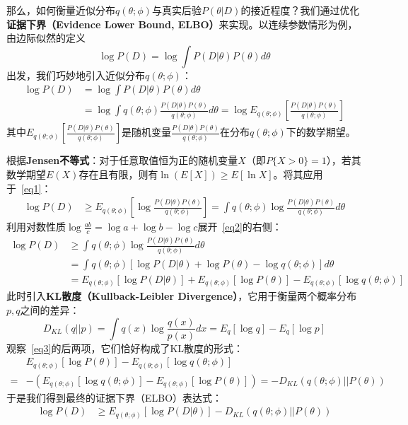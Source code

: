 那么，如何衡量近似分布$q(\theta;\phi)$与真实后验$P(\theta|D)$的接近程度？我们通过优化\textbf{证据下界（Evidence Lower Bound, ELBO）}来实现。以连续参数情形为例，由边际似然的定义
$$\log P(D) = \log \int P(D|\theta)P(\theta)d\theta$$
出发，我们巧妙地引入近似分布$q(\theta;\phi)$：
\begin{align}\label{eq1}
\log P(D) &= \log \int P(D|\theta)P(\theta)d\theta \nonumber \\
          &= \log \int q(\theta;\phi)\frac{P(D|\theta)P(\theta)}{q(\theta;\phi)}d\theta  =   \log {E}_{q(\theta;\phi)}\left[\frac{P(D|\theta)P(\theta)}{q(\theta;\phi)}\right]
\end{align}
其中$E_{q(\theta;\phi)}\left[\frac{P(D|\theta)P(\theta)}{q(\theta;\phi)}\right]$是随机变量$\frac{P(D|\theta)P(\theta)}{q(\theta;\phi)}$在分布$q(\theta;\phi)$下的数学期望。

根据\textbf{Jensen不等式}：对于任意取值恒为正的随机变量$X$（即$P\{X>0\}=1$），若其数学期望$E(X)$存在且有限，则有$\ln(E[X]) \ge E[\ln X]$。将其应用于~\eqref{eq1}：
\begin{align}\label{eq2}
        \log P(D)  &\geq E_{q(\theta;\phi)}\left[\log\frac{P(D|\theta)P(\theta)}{q(\theta;\phi)}\right]
          = \int q(\theta;\phi)\log\frac{P(D|\theta)P(\theta)}{q(\theta;\phi)}d\theta
\end{align}
利用对数性质$\log\frac{ab}{c} = \log a + \log b - \log c$展开~\eqref{eq2}的右侧：
\begin{align}\label{eq3}
        \log P(D)  &\geq    \int q(\theta;\phi)\log\frac{P(D|\theta)P(\theta)}{q(\theta;\phi)}d\theta \nonumber  \\
                   &=    \int q(\theta;\phi)[ \log{P(D|\theta)} + \log P(\theta)-\log q(\theta;\phi)] d\theta \nonumber \\
        &= E_{q(\theta;\phi)}[\log P(D|\theta)] + E_{q(\theta;\phi)}[\log P(\theta)] - E_{q(\theta;\phi)}[\log q(\theta;\phi)]
\end{align}
此时引入\textbf{KL散度（Kullback-Leibler Divergence）}，它用于衡量两个概率分布$p,q$之间的差异：
$$ D_{KL}(q||p) = \int q(x)\log\frac{q(x)}{p(x)}dx = E_q[\log q] - E_q[\log p] $$
观察~\eqref{eq3}的后两项，它们恰好构成了KL散度的形式：
\begin{align*}
& E_{q(\theta;\phi)}[\log P(\theta)] - E_{q(\theta;\phi)}[\log q(\theta;\phi)] \\
=&- \left(E_{q(\theta;\phi)}[\log q(\theta;\phi)]-  E_{q(\theta;\phi)}[\log P(\theta)]  \right) =- D_{KL}(q(\theta;\phi)||P(\theta))
\end{align*}
于是我们得到最终的证据下界（ELBO）表达式：
\begin{align}\label{elbo}
\log P(D) &\geq  E_{q(\theta;\phi)}[\log P(D|\theta)] - D_{KL}(q(\theta;\phi)||P(\theta))
\end{align}

